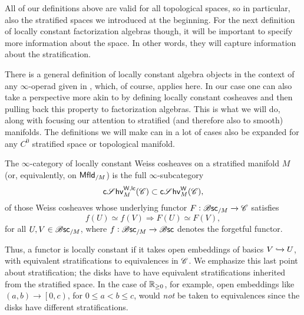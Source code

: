 \documentclass[../text.tex]{subfiles}
\begin{document}
All of our definitions above are valid for all topological spaces, so in particular, also the stratified spaces we introduced at the beginning. For the next definition of locally constant factorization algebras though, it will be important to specify more information about the space. In other words, they will capture information about the stratification.

There is a general definition of locally constant algebra objects in the context of any $\infty$-operad given in \cite[def.2.3.3.20]{lurie_ha}, which, of course, applies here. In our case one can also take a perspective more akin to \cite[def.A.1.12]{lurie_ha} by defining locally constant cosheaves and then pulling back this property to factorization algebras. This is what we will do, along with focusing our attention to stratified (and therefore also to smooth) manifolds. The definitions we will make can in a lot of cases also be expanded for any $C^0$ stratified space or topological manifold.

\begin{definition}
    The $\infty$-category of locally constant Weiss cosheaves on a stratified manifold $M$ (or, equivalently, on $\mfld[r]_{/M}$) is the full $\infty$-subcategory
    \begin{equation}
        \csheaves[W, lc]_M (\catC) \subset \csheaves[W]_M (\catC),
    \end{equation}
    of those Weiss cosheaves whose underlying functor $F: \mathscr{B} \mathsf{sc}_{/M} \xrightarrow{} \mathscr{C}$ satisfies
    \begin{equation}
        f(U) \simeq f(V) \Rightarrow F(U) \simeq F(V),
    \end{equation}
    for all $U, V \in \mathscr{B} \mathsf{sc}_{/M}$, where $f: \mathscr{B} \mathsf{sc}_{/M} \xrightarrow{} \mathscr{B} \mathsf{sc}$ denotes the forgetful functor.
\end{definition}

\begin{remark}
    Thus, a functor is locally constant if it takes open embeddings of basics $V \xhookrightarrow{} U$, with equivalent stratifications to equivalences in $\mathscr{C}$. We emphasize this last point about stratification; the disks have to have equivalent stratifications inherited from the stratified space. In the case of $\mathbb{R}_{\geq 0}$, for example, open embeddings like $(a, b) \rightarrow \left[0, c\right)$, for $0 \leq a < b \leq c$, would \emph{not} be taken to equivalences since the disks have different stratifications.
\end{remark}
\end{document}
